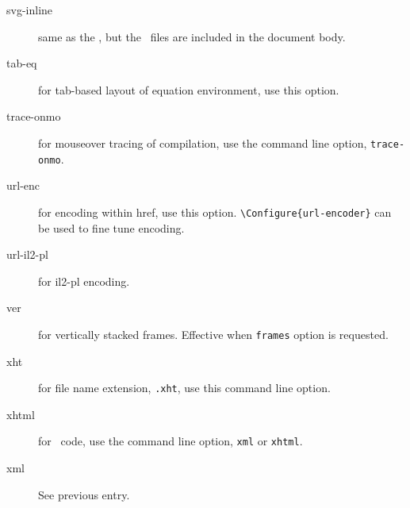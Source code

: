 \begin{description}
\item[svg-inline] same as the , but the \svg\ files are included in the document body.

\item[tab-eq] for tab-based layout of equation environment, use this
  option.


\item[trace-onmo] for mouseover tracing of compilation, use the
  command line option, \verb=trace-onmo=.



\item[url-enc] for \space encoding within href, use this
  option.  \verb=\Configure{url-encoder}= can be used to fine tune
  encoding.

\item[url-il2-pl] for il2-pl  encoding.

\item[ver] for vertically stacked frames. Effective when \verb=frames=
  option is requested.


\item[xht] for file name extension, \verb=.xht=, use this command line
  option.

\item[xhtml] for \xml\ code, use the command line option, \verb=xml= or
  \verb=xhtml=.

\item[xml] See previous entry.


\end{description}
\endgroup
